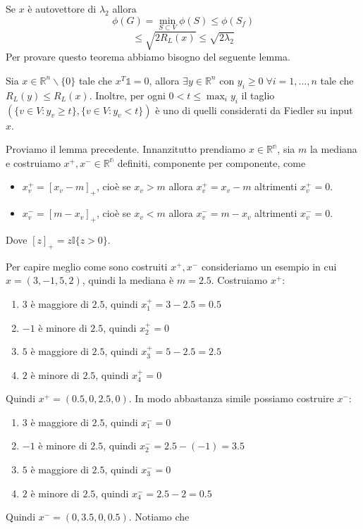 \documentclass[12pt]{report}
\begin{document}
\noindent 
Se $x$ è autovettore di $\lambda_2$ allora 
$$\phi(G) = \min_{S \subset V} \phi(S) \leq \phi(S_f) $$
$$\leq \sqrt{2 R_L(x)} \leq \sqrt{2\lambda_2}$$
Per provare questo teorema abbiamo bisogno del seguente lemma.

\begin{lemma}
    Sia $x \in \mathbb{R}^n \backslash \{0\}$ tale che $x^T \mathds{1} = 0$, allora $\exists y \in \mathbb{R}^n$ con $y_i \geq 0 \; \forall i = 1,\dots,n$ tale che $R_L(y) \leq R_L(x)$. Inoltre, per ogni $0 < t \leq \max_i y_i$ il taglio $(\{v \in V: y_v \geq t\},\{v \in V: y_v < t\})$ è uno di quelli considerati da Fiedler su input $x$.
\end{lemma}

\begin{dimo}
    Proviamo il lemma precedente. Innanzitutto prendiamo $x \in \mathbb{R^n}$, sia $m$ la mediana e costruiamo $x^+,x^- \in \mathbb{R^n}$ definiti, componente per componente, come

    \begin{itemize}
        \item $x_v^+ = [x_v - m]_+$, cioè se $x_v > m$ allora $x_v^+ = x_v - m$ altrimenti $x_v^+ = 0$.
        \item $x_v^- = [m - x_v]_+$, cioè se $x_v < m$ allora $x_v^- =  m - x_v$ altrimenti $x_v^- = 0$.
    \end{itemize}
    Dove $[z]_+ = z \mathds{I}\{z > 0\}$.

    \begin{exmp}
        Per capire meglio come sono costruiti $x^+,x^-$ consideriamo un esempio in cui $x = (3,-1,5,2)$, quindi la mediana è $m =2.5$.
        Costruiamo $x^+$:

        \begin{enumerate}
            \item $3$ è maggiore di $2.5$, quindi $x_1^+ = 3 -2.5 = 0.5$
            \item $-1$ è minore di $2.5$, quindi $x_2^+ = 0$
            \item $5$ è maggiore di $2.5$, quindi $x_3^+ = 5 - 2.5 = 2.5$
            \item $2$ è minore di $2.5$, quindi $x_4^+ = 0$
        \end{enumerate}
        Quindi $x^+ = (0.5,0,2.5,0)$. In modo abbastanza simile possiamo costruire $x^-$:
        \begin{enumerate}
            \item $3$ è maggiore di $2.5$, quindi $x_1^- = 0$
            \item $-1$ è minore di $2.5$, quindi $x_2^- = 2.5 - (-1) = 3.5$
            \item $5$ è maggiore di $2.5$, quindi $x_3^- = 0$
            \item $2$ è minore di $2.5$, quindi $x_4^- = 2.5 - 2 = 0.5$
        \end{enumerate}
        Quindi $x^- = (0,3.5,0,0.5)$. Notiamo che


\end{exmp}
\end{dimo}
\end{document}
